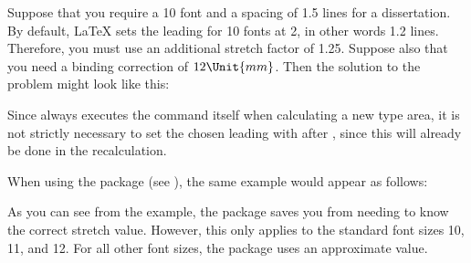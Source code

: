 \begin{Example}
  Suppose that you require a 10 font and a spacing of 1.5 lines for a
  dissertation. By default, {\LaTeX} sets the leading for 10 fonts at
  2, in other words 1.2 lines. Therefore, you must use an additional
  stretch factor of 1.25. Suppose also that you need a binding correction of
  \(12\Unit{mm}\). Then the solution to the problem might look like this:
  Since  always executes the  command
  itself when calculating a new type area, it is not strictly necessary to
  set the chosen leading with  after ,
  since this will already be done in the recalculation.

  When using the %
   package (see \cite{package:setspace}), the
  same example would appear as follows:
\end{Example}

As you can see from the example, the 
package saves you from needing to know the correct stretch value. However,
this only applies to the standard font sizes 10, 11, and
12.  For all other font sizes, the package uses an approximate value.

